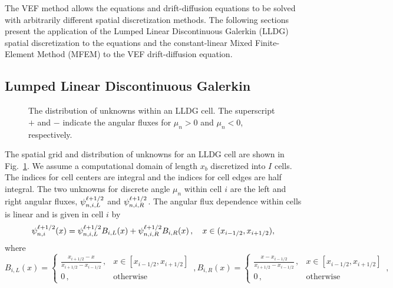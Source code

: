 The VEF method allows the \SN equations and drift-diffusion equations to be solved with arbitrarily different spatial discretization methods. The following sections  present the application of the Lumped Linear Discontinuous Galerkin (LLDG) spatial discretization to the \SN equations and the constant-linear Mixed Finite-Element Method (MFEM) to the VEF drift-diffusion equation. 

\subsection{Lumped Linear Discontinuous Galerkin \SN}
\begin{figure}
	\centering
	
	\caption{The distribution of unknowns within an LLDG cell. The superscript $+$ and $-$ indicate the angular fluxes for $\mu_n>0$ and $\mu_n<0$, respectively. } 
	\label{fig:lldg_grid}
\end{figure}
The spatial grid and distribution of unknowns for an LLDG cell are shown in Fig.~\ref{fig:lldg_grid}. We assume a computational domain of length $x_b$ discretized into $I$ cells. The indices for cell centers are integral and the indices for cell edges are half integral. 
The two unknowns for discrete angle $\mu_n$ within cell $i$ are the left and right angular fluxes, $\psi_{n,i,L}^{\ell+1/2}$ and $\psi_{n,i,R}^{\ell+1/2}$.  The angular flux dependence within cells is linear and is given in cell $i$ by
\begin{equation} \label{eq:afdef}
\psi_{n,i}^{\ell+1/2}(x) = \psi_{n,i,L}^{\ell+1/2} B_{i,L}(x) + \psi_{n,i,R}^{\ell+1/2} B_{i,R}(x) \,, \quad x \in (x_{i-1/2},x_{i+1/2}),
\end{equation}
where
		\begin{subequations}
		\begin{equation}\label{eq:bfunL}
			B_{i,L}(x) = \begin{cases}
				\frac{x_{i+1/2} - x}{x_{i+1/2} - x_{i-1/2}} \,, & x \in [x_{i-1/2}, x_{i+1/2}] \\ 
				0 \,, & \text{otherwise}
			\end{cases} \,,
		\end{equation}
		\begin{equation}\label{eq:bfunR}
			B_{i,R}(x) = \begin{cases}
				\frac{x - x_{i-1/2}}{x_{i+1/2} - x_{i-1/2}} \,, & x \in [x_{i-1/2}, x_{i+1/2}] \\ 
				0 \,, & \text{otherwise}
			\end{cases} \,,
		\end{equation}
	\end{subequations}

